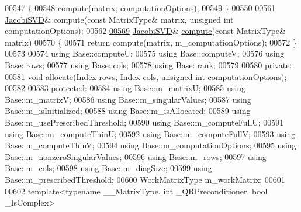 \begin{DoxyCode}
00547     \{
00548       compute(matrix, computationOptions);
00549     \}
00550 
00561     \hyperlink{group___s_v_d___module_class_eigen_1_1_jacobi_s_v_d}{JacobiSVD}& compute(\textcolor{keyword}{const} MatrixType& matrix, \textcolor{keywordtype}{unsigned} \textcolor{keywordtype}{int} computationOptions);
00562 
\hyperlink{group___s_v_d___module_acc7b9a4068cf7b69ae3227d217ed7efd}{00569}     \hyperlink{group___s_v_d___module_class_eigen_1_1_jacobi_s_v_d}{JacobiSVD}& \hyperlink{group___s_v_d___module_acc7b9a4068cf7b69ae3227d217ed7efd}{compute}(\textcolor{keyword}{const} MatrixType& matrix)
00570     \{
00571       \textcolor{keywordflow}{return} compute(matrix, m\_computationOptions);
00572     \}
00573 
00574     \textcolor{keyword}{using} Base::computeU;
00575     \textcolor{keyword}{using} Base::computeV;
00576     \textcolor{keyword}{using} Base::rows;
00577     \textcolor{keyword}{using} Base::cols;
00578     \textcolor{keyword}{using} Base::rank;
00579 
00580   \textcolor{keyword}{private}:
00581     \textcolor{keywordtype}{void} allocate(\hyperlink{group___s_v_d___module_a6229a37997eca1072b52cca5ee7a2bec}{Index} rows, \hyperlink{group___s_v_d___module_a6229a37997eca1072b52cca5ee7a2bec}{Index} cols, \textcolor{keywordtype}{unsigned} \textcolor{keywordtype}{int} computationOptions);
00582 
00583   \textcolor{keyword}{protected}:
00584     \textcolor{keyword}{using} Base::m\_matrixU;
00585     \textcolor{keyword}{using} Base::m\_matrixV;
00586     \textcolor{keyword}{using} Base::m\_singularValues;
00587     \textcolor{keyword}{using} Base::m\_isInitialized;
00588     \textcolor{keyword}{using} Base::m\_isAllocated;
00589     \textcolor{keyword}{using} Base::m\_usePrescribedThreshold;
00590     \textcolor{keyword}{using} Base::m\_computeFullU;
00591     \textcolor{keyword}{using} Base::m\_computeThinU;
00592     \textcolor{keyword}{using} Base::m\_computeFullV;
00593     \textcolor{keyword}{using} Base::m\_computeThinV;
00594     \textcolor{keyword}{using} Base::m\_computationOptions;
00595     \textcolor{keyword}{using} Base::m\_nonzeroSingularValues;
00596     \textcolor{keyword}{using} Base::m\_rows;
00597     \textcolor{keyword}{using} Base::m\_cols;
00598     \textcolor{keyword}{using} Base::m\_diagSize;
00599     \textcolor{keyword}{using} Base::m\_prescribedThreshold;
00600     WorkMatrixType m\_workMatrix;
00601 
00602     \textcolor{keyword}{template}<\textcolor{keyword}{typename} \_\_MatrixType, \textcolor{keywordtype}{int} \_QRPreconditioner, \textcolor{keywordtype}{bool} \_IsComplex>

\end{DoxyCode}
